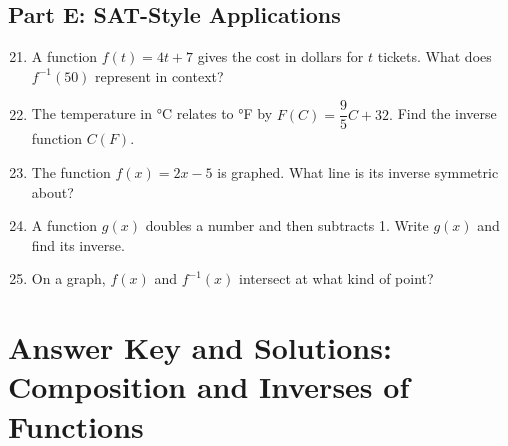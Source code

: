\documentclass[14pt]{extarticle}
\begin{document}
\subsection*{Part E: SAT-Style Applications}
\begin{enumerate}
  \setcounter{enumi}{20}
  \item A function \(f(t) = 4t + 7\) gives the cost in dollars for \(t\) tickets.  
  What does \(f^{-1}(50)\) represent in context?
  \item The temperature in °C relates to °F by \(F(C) = \dfrac{9}{5}C + 32.\)  
  Find the inverse function \(C(F)\).
  \item The function \(f(x) = 2x - 5\) is graphed. What line is its inverse symmetric about?
  \item A function \(g(x)\) doubles a number and then subtracts 1.  
  Write \(g(x)\) and find its inverse.
  \item On a graph, \(f(x)\) and \(f^{-1}(x)\) intersect at what kind of point?
\end{enumerate}

\newpage


\section*{Answer Key and Solutions: Composition and Inverses of Functions}
\end{document}
